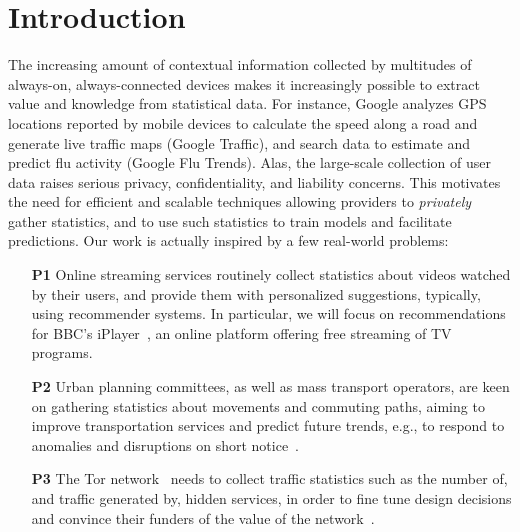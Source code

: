 \documentclass[conference]{IEEEtran}
\begin{document}
\section{Introduction}
The increasing amount of contextual information collected by multitudes of always-on, always-connected devices makes it increasingly possible to extract value and knowledge from statistical data. For instance, Google analyzes GPS locations reported by mobile devices to calculate the speed along a road and generate live traffic maps (Google Traffic), and search data to estimate and predict flu activity (Google Flu Trends). Alas, the large-scale collection of user data raises serious privacy, confidentiality, and liability concerns. 
This motivates the need for efficient and scalable techniques allowing providers to {\em privately} gather statistics, and to use such statistics to train models and facilitate predictions. Our work is actually inspired by a few real-world problems:
\begin{enumerate}
\setlength\itemsep{0.5em}
\item[\bf P1]  Online streaming services routinely collect statistics about videos watched by their users, and provide them with personalized suggestions, typically, using recommender systems. 
In particular, we will focus on recommendations for BBC's iPlayer~\cite{iplayer}, an online platform offering free streaming of TV programs.
\item[\bf P2] Urban planning committees, as well as mass transport operators, are keen on gathering statistics about movements and commuting paths, aiming to improve transportation services and predict future trends, e.g., to respond to anomalies and disruptions on short notice~\cite{scellato2011nextplace,pejovic2013anticipatory}.
\item[\bf P3] The Tor network~\cite{Tor} needs to collect traffic statistics such as the number of, and traffic generated by, hidden services, in order to fine tune design decisions and convince their funders of the value of the network~\cite{elahi2014privex}. 
\end{enumerate}
\end{document}
